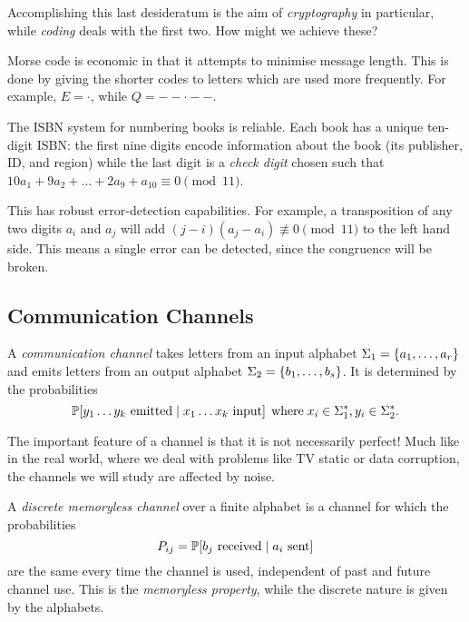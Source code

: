 \documentclass{article}
\begin{document}
Accomplishing this last desideratum is the aim of \textit{cryptography} in particular,
while \textit{coding} deals with the first two.
How might we achieve these?

\begin{remark}
	\label{economy-and-reliability}
    Morse code is economic in that it attempts to minimise message length.
    This is done by giving the shorter codes to
    letters which are used more frequently.
    For example, $E = \cdot$, while $Q = -- \cdot --$.

	The ISBN system for numbering books is reliable.
	Each book has a unique ten-digit ISBN:
	the first nine digits encode information about the book
	(its publisher, ID, and region)
	while the last digit is a \textit{check digit}
	chosen such that $10 a_1 + 9 a_2 + \dots + 2a_9 + a_{10} \equiv 0 \pmod{11}$.
	
	This has robust error-detection capabilities.
	For example, a transposition of any two digits $a_{i}$ and $a_{j}$
	will add $(j-i)(a_{j} - a_i) \not\equiv 0 \pmod{11}$
	to the left hand side.
	This means a single error can be detected,
	since the congruence will be broken.
\end{remark}


\subsection{Communication Channels}

\begin{definition}[Channel]
	\label{channel-definition}
    A \textit{communication channel} takes letters from an input alphabet
    $\Sigma_1 = \set{a_1, \dots, a_r}$
    and emits letters from an output alphabet
    $\Sigma_2 = \set{b_1, \dots, b_s}$.
    It is determined by the probabilities
	\[
	\P[y_1\dots y_k \text{ emitted} \mid x_1\dots x_k \text{ input}]
	\where x_i \in \Sigma_1^*, y_i \in \Sigma_2^*.
	\]
\end{definition}

\begin{note}
	The important feature of a channel is that it is not necessarily perfect!
	Much like in the real world,
	where we deal with problems like TV static or data corruption,
	the channels we will study are affected by noise.
\end{note}

\begin{definition}
	\label{discrete-memoryless-channel}
    A \textit{discrete memoryless channel} over a finite alphabet
    is a channel for which the probabilities
	\[
	P_{ij} = \P[b_j \text{ received} \mid a_i \text{ sent}]
	\]
	are the same every time the channel is used,
	independent of past and future channel use.
	This is the \textit{memoryless property},
	while the discrete nature is given by the alphabets.
\end{definition}
\end{document}
